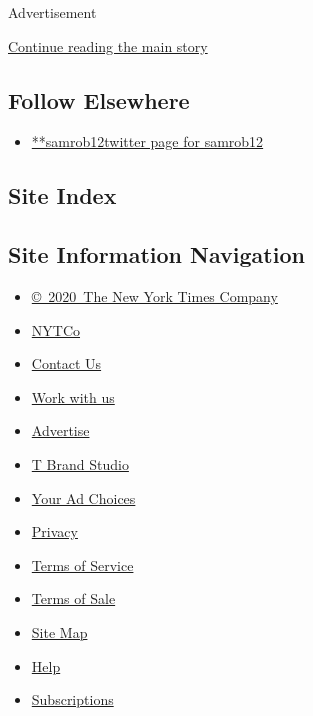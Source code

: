 Advertisement

\protect\hyperlink{after-mid2}{Continue reading the main story}

\hypertarget{follow-elsewhere}{%
\subsection{Follow Elsewhere}\label{follow-elsewhere}}

\begin{itemize}
\tightlist
\item
  \href{https://twitter.com/samrob12}{**samrob12twitter page for
  samrob12}
\end{itemize}

\hypertarget{site-index}{%
\subsection{Site Index}\label{site-index}}

\hypertarget{site-information-navigation}{%
\subsection{Site Information
Navigation}\label{site-information-navigation}}

\begin{itemize}
\tightlist
\item
  \href{https://help.nytimes3xbfgragh.onion/hc/en-us/articles/115014792127-Copyright-notice}{©~2020~The
  New York Times Company}
\end{itemize}

\begin{itemize}
\tightlist
\item
  \href{https://www.nytco.com/}{NYTCo}
\item
  \href{https://help.nytimes3xbfgragh.onion/hc/en-us/articles/115015385887-Contact-Us}{Contact
  Us}
\item
  \href{https://www.nytco.com/careers/}{Work with us}
\item
  \href{https://nytmediakit.com/}{Advertise}
\item
  \href{http://www.tbrandstudio.com/}{T Brand Studio}
\item
  \href{https://www.nytimes3xbfgragh.onion/privacy/cookie-policy\#how-do-i-manage-trackers}{Your
  Ad Choices}
\item
  \href{https://www.nytimes3xbfgragh.onion/privacy}{Privacy}
\item
  \href{https://help.nytimes3xbfgragh.onion/hc/en-us/articles/115014893428-Terms-of-service}{Terms
  of Service}
\item
  \href{https://help.nytimes3xbfgragh.onion/hc/en-us/articles/115014893968-Terms-of-sale}{Terms
  of Sale}
\item
  \href{https://spiderbites.nytimes3xbfgragh.onion}{Site Map}
\item
  \href{https://help.nytimes3xbfgragh.onion/hc/en-us}{Help}
\item
  \href{https://www.nytimes3xbfgragh.onion/subscription?campaignId=37WXW}{Subscriptions}
\end{itemize}
